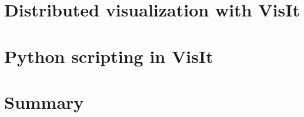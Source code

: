 \documentclass[xcolor=svgnames]{beamer}
\providecommand{\sectionpage}{\Large\centering \bf\mediumblue\insertsection}
\begin{document}
\section{Distributed visualization with VisIt}
\advEnv
\frame{\sectionpage}
 
\resetEnv

\section{Python scripting in VisIt}
\advEnv
\frame{\sectionpage}
 
\resetEnv

\section{Summary}
\frame{\sectionpage}
 
\end{document}
